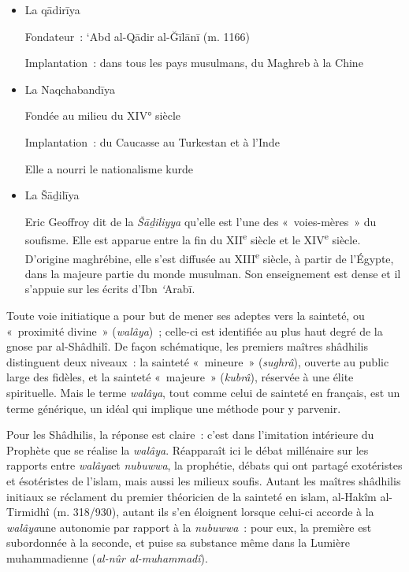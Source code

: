 \begin{itemize}
\item
  La qādirīya


Fondateur~: `Abd al-Qādir al-Ğīlānī (m. 1166)

Implantation~: dans tous les pays musulmans, du Maghreb à la Chine


\item
  La Naqchabandīya

Fondée au milieu du XIV° siècle

Implantation~: du Caucasse au Turkestan et à l'Inde

Elle a nourri le nationalisme kurde


\item
  La Šāḏilīya


Eric Geoffroy dit de la \emph{Šāḏiliyya} qu'elle est l'une des
«~voies-mères~» du soufisme. Elle est apparue entre la fin du
XII\textsuperscript{e} siècle et le XIV\textsuperscript{e} siècle.
D'origine maghrébine, elle s'est diffusée au XIII\textsuperscript{e}
siècle, à partir de l'Égypte, dans la majeure partie du monde musulman.
Son enseignement est dense et il s'appuie sur les écrits d'Ibn
\emph{`}Arabī.
\end{itemize}
Toute voie initiatique a pour but de mener ses adeptes vers la sainteté,
ou «~proximité divine~» (\emph{walâya})~; celle-ci est identifiée au
plus haut degré de la gnose par al-Shâdhilî. De façon schématique, les
premiers maîtres shâdhilis distinguent deux niveaux~: la sainteté
«~mineure~» (\emph{sughrâ}), ouverte au public large des fidèles, et la
sainteté «~majeure~» (\emph{kubrâ}), réservée à une élite spirituelle.
Mais le terme \emph{walâya}, tout comme celui de sainteté en français,
est un terme générique, un idéal qui implique une méthode pour y
parvenir.

Pour les Shâdhilis, la réponse est claire~: c'est dans l'imitation
intérieure du Prophète que se réalise la \emph{walâya}. Réapparaît ici
le débat millénaire sur les rapports entre \emph{walâya}et
\emph{nubuwwa}, la prophétie, débats qui ont partagé exotéristes et
ésotéristes de l'islam, mais aussi les milieux soufis. Autant les
maîtres shâdhilis initiaux se réclament du premier théoricien de la
sainteté en islam, al-Hakîm al-Tirmidhî (m. 318/930), autant ils s'en
éloignent lorsque celui-ci accorde à la \emph{walâya}une autonomie par
rapport à la \emph{nubuwwa}~: pour eux, la première est subordonnée à la
seconde, et puise sa substance même dans la Lumière muhammadienne
(\emph{al-nûr al-muhammadî}).

